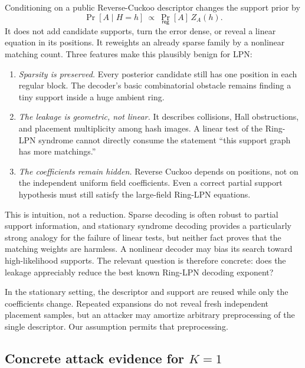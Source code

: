 Conditioning on a public Reverse-Cuckoo descriptor changes the support prior
by
\begin{equation}\label{eq:rc-posterior-reweighting}
 \Pr[A\mid H=h]\ \propto\
 \Pr_{\mathsf{reg}}[A]\,Z_A(h).
\end{equation}
It does not add candidate supports, turn the error dense, or reveal a linear
equation in its positions.  It reweights an already sparse family by a
nonlinear matching count.  Three features make this plausibly benign for LPN:

\begin{enumerate}
 \item \emph{Sparsity is preserved.}  Every posterior candidate still has one
       position in each regular block.  The decoder's basic combinatorial
       obstacle remains finding a tiny support inside a huge ambient ring.
 \item \emph{The leakage is geometric, not linear.}  It describes collisions,
       Hall obstructions, and placement multiplicity among hash images.  A
       linear test of the Ring-LPN syndrome cannot directly consume the
       statement ``this support graph has more matchings.''
 \item \emph{The coefficients remain hidden.}  Reverse Cuckoo depends on
       positions, not on the independent uniform field coefficients.  Even a
       correct partial support hypothesis must still satisfy the large-field
       Ring-LPN equations.
\end{enumerate}

This is intuition, not a reduction.  Sparse decoding is often robust to
partial support information, and stationary syndrome decoding provides a
particularly strong analogy for the failure of linear tests, but neither fact
proves that the matching weights are harmless.  A nonlinear decoder may bias
its search toward high-likelihood supports.  The relevant question is
therefore concrete: does the leakage appreciably reduce the best known
Ring-LPN decoding exponent?

In the stationary setting, the descriptor and support are reused while only
the coefficients change.  Repeated expansions do not reveal fresh independent
placement samples, but an attacker may amortize arbitrary preprocessing of the
single descriptor.  Our assumption permits that preprocessing.

\subsection{Concrete attack evidence for \texorpdfstring{$K=1$}{K=1}}
\label{sec:revCuckooAttacks}


